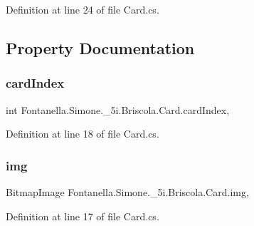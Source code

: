 Definition at line 24 of file Card.\+cs.



\subsection{Property Documentation}
\hypertarget{class_fontanella_1_1_simone_1_1__5i_1_1_briscola_1_1_card_a171a027469d728688df3f9172e04a3a0}{}\label{class_fontanella_1_1_simone_1_1__5i_1_1_briscola_1_1_card_a171a027469d728688df3f9172e04a3a0} 
\subsubsection{\texorpdfstring{card\+Index}{cardIndex}}
{\footnotesize\ttfamily int Fontanella.\+Simone.\+\_\+5i.\+Briscola.\+Card.\+card\+Index\hspace{0.3cm}{\ttfamily [get]}, {\ttfamily [set]}}



Definition at line 18 of file Card.\+cs.

\hypertarget{class_fontanella_1_1_simone_1_1__5i_1_1_briscola_1_1_card_ae310d70e334b89c1feea95ca77d88633}{}\label{class_fontanella_1_1_simone_1_1__5i_1_1_briscola_1_1_card_ae310d70e334b89c1feea95ca77d88633} 
\subsubsection{\texorpdfstring{img}{img}}
{\footnotesize\ttfamily Bitmap\+Image Fontanella.\+Simone.\+\_\+5i.\+Briscola.\+Card.\+img\hspace{0.3cm}{\ttfamily [get]}, {\ttfamily [set]}}



Definition at line 17 of file Card.\+cs.

\hypertarget{class_fontanella_1_1_simone_1_1__5i_1_1_briscola_1_1_card_a17dd300b4ba6f6eda18c73252bebb745}{}\label{class_fontanella_1_1_simone_1_1__5i_1_1_briscola_1_1_card_a17dd300b4ba6f6eda18c73252bebb745} 

